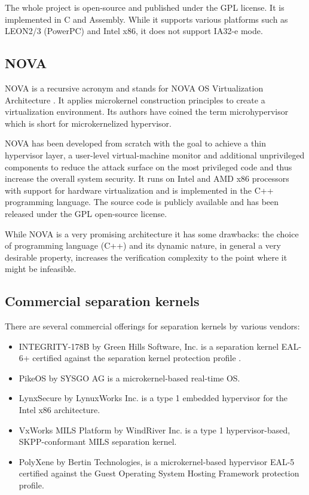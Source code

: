 The whole project is open-source and published under the GPL license. It is
implemented in C and Assembly. While it supports various platforms such as
LEON2/3 (PowerPC) and Intel x86, it does not support IA32-e mode.

\subsection{NOVA}
NOVA is a recursive acronym and stands for NOVA OS Virtualization Architecture
\cite{Steinberg:2010:NMS:1755913.1755935}. It applies microkernel construction
principles to create a virtualization environment. Its authors have coined
the term microhypervisor which is short for
microkernelized hypervisor.

NOVA has been developed from scratch with the goal to achieve a thin hypervisor
layer, a user-level virtual-machine monitor and additional unprivileged
components to reduce the attack surface on the most privileged code and thus
increase the overall system security. It runs on Intel and AMD x86 processors
with support for hardware virtualization and is implemented in the C++
programming language. The source code is publicly available \cite{NOVA} and has
been released under the GPL open-source license.

While NOVA is a very promising architecture it has some drawbacks: the choice of
programming language (C++) and its dynamic nature, in general a very desirable
property, increases the verification complexity to the point where it might be
infeasible.

\subsection{Commercial separation kernels}\label{subsec:commercial-sks}
There are several commercial offerings for separation kernels by various
vendors:

\begin{itemize}
	\item INTEGRITY-178B by Green Hills Software, Inc. is a separation kernel
		EAL-6+ certified against the separation kernel protection profile
		\cite{SKPP}.
	\item PikeOS by SYSGO AG is a microkernel-based real-time OS.
	\item LynxSecure by LynuxWorks Inc. is a type 1 embedded hypervisor for the
		Intel x86 architecture.
	\item VxWorks MILS Platform by WindRiver Inc. is a type 1 hypervisor-based,
		SKPP-conformant MILS separation kernel.
	\item PolyXene by Bertin Technologies, is a microkernel-based hypervisor
		EAL-5 certified against the Guest Operating System Hosting Framework
		protection profile.
\end{itemize}

